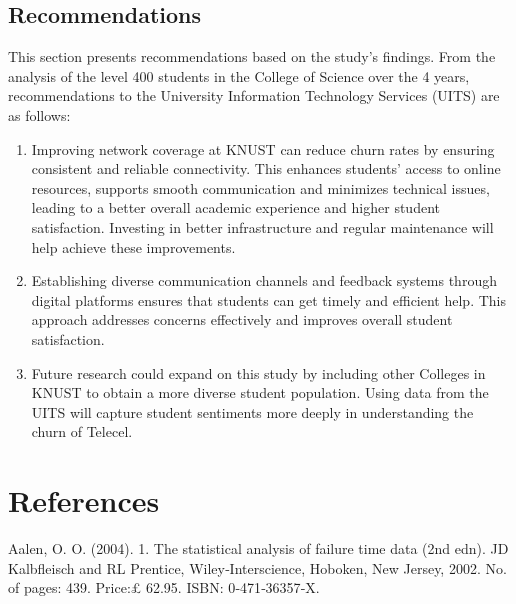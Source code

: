 \documentclass[doublespacing,12pt]{report}
\begin{document}
{ 



\section{Recommendations}
\normalsize{This section presents recommendations based on the study’s findings. From the analysis of the level 400 students in the College of Science over the 4 years, recommendations to the University Information Technology Services (UITS)  are as follows:}
\begin{enumerate}
        \item \normalsize{Improving network coverage at KNUST can reduce churn rates by ensuring consistent and reliable connectivity. This enhances students' access to online resources, supports smooth communication and minimizes technical issues, leading to a better overall academic experience and higher student satisfaction. Investing in better infrastructure and regular maintenance will help achieve these improvements}.

    \item  \normalsize{Establishing diverse communication channels and feedback systems through digital platforms ensures that students can get timely and efficient help. This approach addresses concerns effectively and improves overall student satisfaction.}
 
	\item \normalsize{Future research could expand on this study by including other Colleges in KNUST to obtain a more diverse student population. Using data from the UITS will capture student sentiments more deeply in understanding the churn of Telecel.}

\end{enumerate}









\chapter*{References}


\begin{enumerate}[label=\textbf{[\arabic*]}]
    \item Aalen, O. O. (2004). 1. The statistical analysis of failure time data (2nd edn). JD Kalbfleisch and RL Prentice, Wiley‐Interscience, Hoboken, New Jersey, 2002. No. of pages: 439. Price:£ 62.95. ISBN: 0‐471‐36357‐X. 
    

\end{enumerate}}
\end{document}
